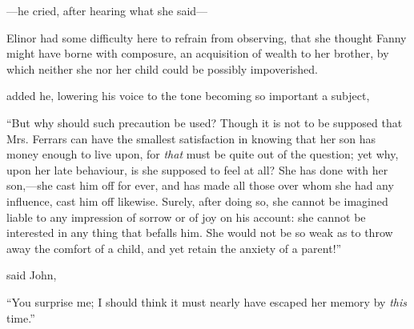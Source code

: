 ---he cried, after hearing what she said---



Elinor had some difficulty here to refrain from observing, that she thought Fanny might have borne with composure, an acquisition of wealth to her brother, by which neither she nor her child could be possibly impoverished.

 added he, lowering his voice to the tone becoming so important a subject, 

“But why should such precaution be used? Though it is not to be supposed that Mrs. Ferrars can have the smallest satisfaction in knowing that her son has money enough to live upon, for {\em that} must be quite out of the question; yet why, upon her late behaviour, is she supposed to feel at all? She has done with her son,---she cast him off for ever, and has made all those over whom she had any influence, cast him off likewise. Surely, after doing so, she cannot be imagined liable to any impression of sorrow or of joy on his account: she cannot be interested in any thing that befalls him. She would not be so weak as to throw away the comfort of a child, and yet retain the anxiety of a parent!”

 said John, 

“You surprise me; I should think it must nearly have escaped her memory by {\em this} time.”


